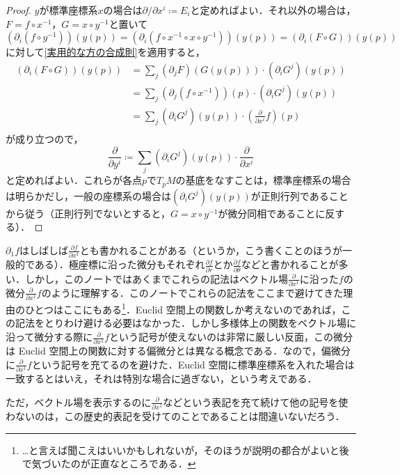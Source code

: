 \begin{proof}
$y$が標準座標系$x$の場合は$\partial / \partial x^i \coloneqq E_i$と定めればよい．それ以外の場合は，$F = f \circ x^{-1}$，$G = x \circ y^{-1}$と置いて$\left(\partial_i (f \circ y^{-1}) \right) (y (p)) = \left(\partial_i (f \circ x^{-1} \circ x \circ y^{-1}) \right) (y (p)) = \left(\partial_i (F \circ G) \right) (y (p))$に対して\cref{実用的な方の合成則}を適用すると，
\begin{align}
\left(\partial_i (F \circ G) \right) (y (p)) &= \sum_{j} (\partial_j F)(G(y(p))) \cdot (\partial_i G^j)(y(p))\\
&= \sum_{j} (\partial_j (f \circ x^{-1}))(p) \cdot (\partial_i G^j)(y(p))\\
&= \sum_{j} (\partial_i G^j)(y(p)) \cdot \left(\frac{\partial}{\partial x^i} f\right)(p)\\
\end{align}が成り立つので，
\begin{equation}
\frac{\partial}{\partial y^i} \coloneqq \sum_{j} (\partial_i G^j)(y(p)) \cdot \frac{\partial}{\partial x^i}
\end{equation}と定めればよい．これらが各点$p$で$T_pM$の基底をなすことは，標準座標系の場合は明らかだし，一般の座標系の場合は$(\partial_i G^j)(y(p))$が正則行列であることから従う（正則行列でないとすると，$G = x \circ y^{-1}$が微分同相であることに反する）．
\end{proof}

\begin{dig}$\partial_1 f$はしばしば$\frac{\partial f}{\partial x^1}$とも書かれることがある（というか，こう書くことのほうが一般的である）．極座標に沿った微分もそれぞれ$\frac{\partial f}{\partial r}$とか$\frac{\partial f}{\partial \theta}$などと書かれることが多い．しかし，このノートではあくまでこれらの記法はベクトル場$\frac{\partial}{\partial x^1}$に沿った$f$の微分$\frac{\partial}{\partial x^1}f$のように理解する．このノートでこれらの記法をここまで避けてきた理由のひとつはここにもある\footnote{…と言えば聞こえはいいかもしれないが，そのほうが説明の都合がよいと後で気づいたのが正直なところである．}．Euclid 空間上の関数しか考えないのであれば，この記法をとりわけ避ける必要はなかった．しかし多様体上の関数をベクトル場に沿って微分する際に$\frac{\partial}{\partial x^1}f$という記号が使えないのは非常に厳しい反面，この微分は Euclid 空間上の関数に対する偏微分とは異なる概念である．なので，偏微分に$\frac{\partial}{\partial x^1}f$という記号を充てるのを避けた．Euclid 空間に標準座標系を入れた場合は一致するとはいえ，それは特別な場合に過ぎない，という考えである．

ただ，ベクトル場を表示するのに$\frac{\partial}{\partial x^1}$などという表記を充て続けて他の記号を使わないのは，この歴史的表記を受けてのことであることは間違いないだろう．
\end{dig}

